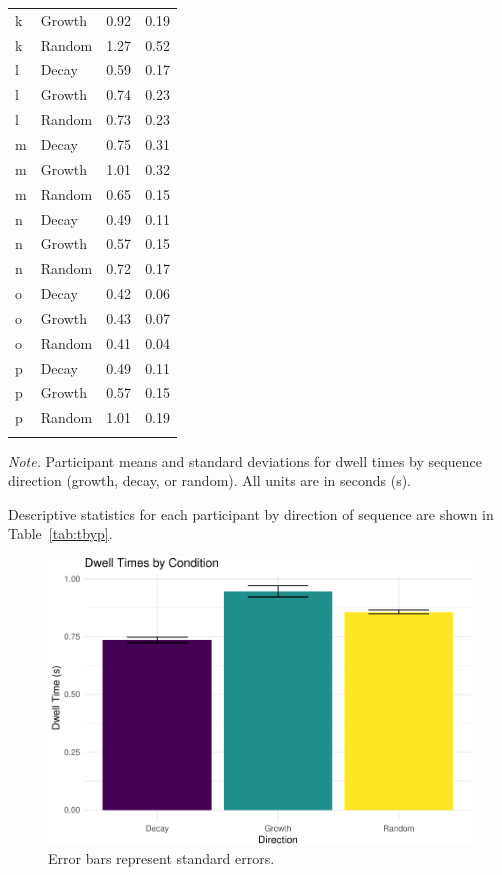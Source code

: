 \documentclass[english,jou]{apa6}
\begin{document}
\begin{table}[htbp]
\begin{center}
\begin{threeparttable}
\begin{tabular}{llll}
k & Growth & 0.92 & 0.19\\
k & Random & 1.27 & 0.52\\
l & Decay & 0.59 & 0.17\\
l & Growth & 0.74 & 0.23\\
l & Random & 0.73 & 0.23\\
m & Decay & 0.75 & 0.31\\
m & Growth & 1.01 & 0.32\\
m & Random & 0.65 & 0.15\\
n & Decay & 0.49 & 0.11\\
n & Growth & 0.57 & 0.15\\
n & Random & 0.72 & 0.17\\
o & Decay & 0.42 & 0.06\\
o & Growth & 0.43 & 0.07\\
o & Random & 0.41 & 0.04\\
p & Decay & 0.49 & 0.11\\
p & Growth & 0.57 & 0.15\\
p & Random & 1.01 & 0.19\\
\bottomrule
\addlinespace
\end{tabular}

\begin{tablenotes}[para]
\normalsize{\textit{Note.} Participant means and standard deviations for dwell times by sequence direction (growth, decay, or random). All units are in seconds (s).}
\end{tablenotes}

\end{threeparttable}
\end{center}

\end{table}

Descriptive statistics for each participant by direction of sequence are shown in Table~\ref{tab:tbyp}.

\begin{figure}
\centering
\includegraphics{paper_papaja_files/figure-latex/main-1.pdf}
\caption{\label{fig:main}Error bars represent standard errors.}
\end{figure}
\end{document}
